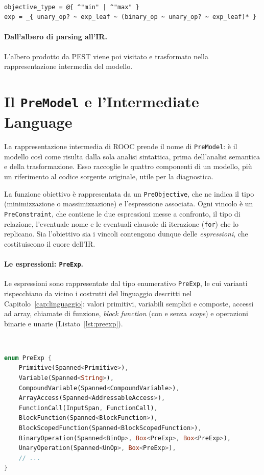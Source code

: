 \

\begin{lstlisting}[language=pest, caption={Esempi di regola atomica, silenziosa e di scelta ordinata.}, label={lst:grammar-misc}]
objective_type = @{ ^"min" | ^"max" }
exp = _{ unary_op? ~ exp_leaf ~ (binary_op ~ unary_op? ~ exp_leaf)* }
\end{lstlisting}

\paragraph{Dall'albero di parsing all'IR.}
L'albero prodotto da PEST viene poi visitato e trasformato nella rappresentazione intermedia del modello.

\section{Il \texttt{PreModel} e l'Intermediate Language}
\label{sec:premodel}

La rappresentazione intermedia di ROOC prende il nome di \texttt{PreModel}: è il
modello così come risulta dalla sola analisi sintattica, prima dell'analisi
semantica e della trasformazione. Esso raccoglie le quattro componenti di un
modello, più un riferimento al codice sorgente originale, utile per la
diagnostica.

La funzione obiettivo è rappresentata da un \texttt{PreObjective}, che ne indica
il tipo (minimizzazione o massimizzazione) e l'espressione associata. Ogni
vincolo è un \texttt{PreConstraint}, che contiene le due espressioni messe a
confronto, il tipo di relazione, l'eventuale nome e le eventuali clausole di
iterazione (\texttt{for}) che lo replicano. Sia l'obiettivo sia i vincoli
contengono dunque delle \emph{espressioni}, che costituiscono il cuore dell'IR.

\paragraph{Le espressioni: \texttt{PreExp}.}
Le espressioni sono rappresentate dal tipo enumerativo \texttt{PreExp}, le cui
varianti rispecchiano da vicino i costrutti del linguaggio descritti nel
Capitolo~\ref{cap:linguaggio}: valori primitivi, variabili semplici e composte,
accessi ad array, chiamate di funzione, \emph{block function} (con e senza
\emph{scope}) e operazioni binarie e unarie (Listato~\ref{lst:preexp}).

\

\begin{lstlisting}[language=rust, caption={Versione semplificata dell'enumerazione \texttt{PreExp}.}, label={lst:preexp}]
enum PreExp {
    Primitive(Spanned<Primitive>),
    Variable(Spanned<String>),
    CompoundVariable(Spanned<CompoundVariable>),
    ArrayAccess(Spanned<AddressableAccess>),
    FunctionCall(InputSpan, FunctionCall),
    BlockFunction(Spanned<BlockFunction>),
    BlockScopedFunction(Spanned<BlockScopedFunction>),
    BinaryOperation(Spanned<BinOp>, Box<PreExp>, Box<PreExp>),
    UnaryOperation(Spanned<UnOp>, Box<PreExp>),
    // ...
}
\end{lstlisting}

